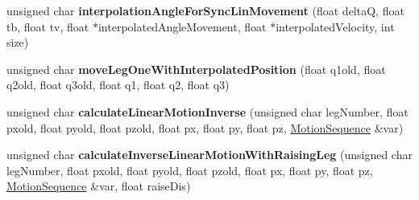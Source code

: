 \begin{DoxyCompactItemize}
unsigned char {\bfseries interpolation\+Angle\+For\+Sync\+Lin\+Movement} (float deltaQ, float tb, float tv, float $\ast$interpolated\+Angle\+Movement, float $\ast$interpolated\+Velocity, int size)
\item 
\mbox{\label{class_movement_controller_ae58ec5af97b9f1c65c375a779c77cd16}} 
unsigned char {\bfseries move\+Leg\+One\+With\+Interpolated\+Position} (float q1old, float q2old, float q3old, float q1, float q2, float q3)
\item 
\mbox{\label{class_movement_controller_a0f0576b09a2fc1913998b7723da573a6}} 
unsigned char {\bfseries calculate\+Linear\+Motion\+Inverse} (unsigned char leg\+Number, float pxold, float pyold, float pzold, float px, float py, float pz, \mbox{\hyperlink{class_motion_sequence}{Motion\+Sequence}} \&var)
\item 
\mbox{\label{class_movement_controller_a60983e94a4a197f92a932701e357fd34}} 
unsigned char {\bfseries calculate\+Inverse\+Linear\+Motion\+With\+Raising\+Leg} (unsigned char leg\+Number, float pxold, float pyold, float pzold, float px, float py, float pz, \mbox{\hyperlink{class_motion_sequence}{Motion\+Sequence}} \&var, float raise\+Dis)
\end{DoxyCompactItemize}
